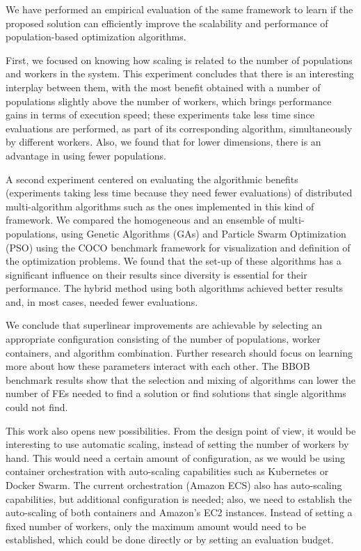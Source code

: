 \documentclass[review]{elsarticle}
\begin{document}
We have performed an empirical evaluation of the same framework to learn if the proposed
solution can efficiently improve the scalability and performance of
population-based optimization algorithms.

First, we focused on knowing how scaling is related to the number of populations
and workers in the system. This experiment concludes that there is an
interesting interplay between them, with the most benefit obtained with a number of
populations slightly above the number of workers, which brings performance gains
in terms of execution speed; these experiments take less time since
evaluations are performed, as part of its corresponding algorithm, simultaneously by different workers.
Also, we found that for lower dimensions, there is an advantage in using fewer
populations.

A second experiment centered on evaluating the algorithmic benefits
(experiments taking less time because they need fewer evaluations) of
distributed multi-algorithm algorithms such as the ones implemented in
this kind of framework.  We compared the homogeneous and an ensemble
of multi-populations, using Genetic Algorithms (GAs) and Particle
Swarm Optimization (PSO) using the COCO benchmark framework for
visualization and definition of the optimization problems.  We found
that the set-up of these algorithms has a significant influence on
their results since diversity is essential for their performance. The
hybrid method using both algorithms achieved better results and, in
most cases, needed fewer evaluations.

We conclude that superlinear improvements are achievable by selecting an
appropriate configuration consisting of the number of populations, worker
containers, and algorithm combination. Further research should focus on learning
more about how these parameters interact with each other. The BBOB benchmark
results show that the selection and mixing of algorithms can lower the number of
FEs needed to find a solution or find solutions that single algorithms could not
find.

This work also opens new possibilities. From the design point of view, it would
be interesting to use automatic scaling, instead of setting the number of
workers by hand. This would need a certain amount of configuration, as we would
be using container orchestration with auto-scaling capabilities such as
Kubernetes or Docker Swarm. The current orchestration (Amazon ECS) also has
auto-scaling capabilities, but additional configuration is needed; also, we need
to establish the auto-scaling of both containers and Amazon's EC2 instances.
Instead of setting a fixed number of workers, only the maximum amount would need
to be established, which could be done directly or by setting an evaluation
budget.
\end{document}
